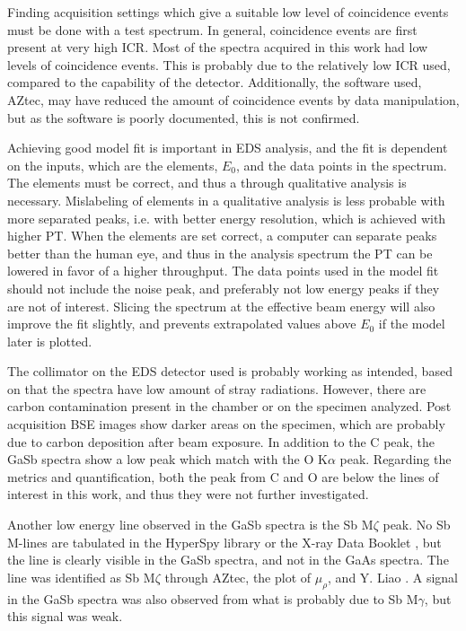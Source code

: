 Finding acquisition settings which give a suitable low level of coincidence events must be done with a test spectrum.
In general, coincidence events are first present at very high ICR.
Most of the spectra acquired in this work had low levels of coincidence events.
This is probably due to the relatively low ICR used, compared to the capability of the detector.
Additionally, the software used, AZtec, may have reduced the amount of coincidence events by data manipulation, but as the software is poorly documented, this is not confirmed.



Achieving good model fit is important in EDS analysis, and the fit is dependent on the inputs, which are the elements, $E_0$, and the data points in the spectrum.
The elements must be correct, and thus a through qualitative analysis is necessary.
Mislabeling of elements in a qualitative analysis is less probable with more separated peaks, i.e. with better energy resolution, which is achieved with higher PT.
When the elements are set correct, a computer can separate peaks better than the human eye, and thus in the analysis spectrum the PT can be lowered in favor of a higher throughput.
The data points used in the model fit should not include the noise peak, and preferably not low energy peaks if they are not of interest.
Slicing the spectrum at the effective beam energy will also improve the fit slightly, and prevents extrapolated values above $E_0$ if the model later is plotted.



The collimator on the EDS detector used is probably working as intended, based on that the spectra have low amount of stray radiations.
However, there are carbon contamination present in the chamber or on the specimen analyzed.
Post acquisition BSE images show darker areas on the specimen, which are probably due to carbon deposition after beam exposure.
In addition to the C peak, the GaSb spectra show a low peak which match with the O K$\alpha$ peak.
Regarding the metrics and quantification, both the peak from C and O are below the lines of interest in this work, and thus they were not further investigated.

Another low energy line observed in the GaSb spectra is the Sb M$\zeta$ peak.
No Sb M-lines are tabulated in the HyperSpy library \cite{hyperspy_1.7.1} or the X-ray Data Booklet \cite{thompson_x-ray_2004}, but the line is clearly visible in the GaSb spectra, and not in the GaAs spectra.
The line was identified as Sb M$\zeta$ through AZtec, the plot of $\mu_\rho$, and Y. Liao \cite{liao2006practical}.
A signal in the GaSb spectra was also observed from what is probably due to Sb M$\gamma$, but this signal was weak.

